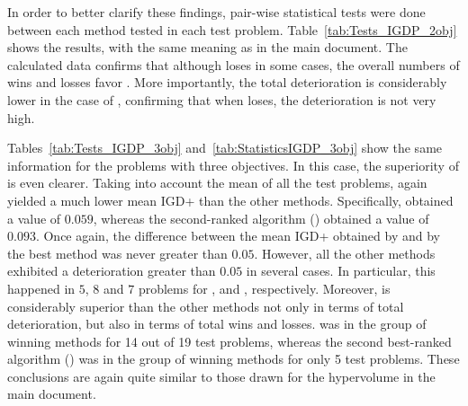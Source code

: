 In order to better clarify these findings, pair-wise statistical tests were done between each method tested in each 
test problem.
%
Table~\ref{tab:Tests_IGDP_2obj} shows the results, with the same meaning as in the main document.
%
The calculated data confirms that although \VSDMOEA{} loses in some cases, the overall numbers of wins and losses favor \VSDMOEA{}.
%
More importantly, the total deterioration is considerably lower in the case of \VSDMOEA{}, confirming that 
when \VSDMOEA{} loses, the deterioration is not very high.

Tables~\ref{tab:Tests_IGDP_3obj} and~\ref{tab:StatisticsIGDP_3obj} show the same information for the problems with three objectives.
%
In this case, the superiority of \VSDMOEA{} is even clearer.
%
Taking into account the mean of all the test problems, \VSDMOEA{} again yielded a much lower mean IGD+ than the other methods.
%
Specifically, \VSDMOEA{} obtained a value of $0.059$, whereas the second-ranked algorithm (\RMOEA{}) obtained a value of $0.093$.
%
Once again, the difference between the mean IGD+ obtained by \VSDMOEA{} and by the best method was never greater
than $0.05$.
%
However, all the other methods exhibited a deterioration greater than $0.05$ in several cases.
%
In particular, this happened in $5$, $8$ and $7$ problems for \MOEAD{}, \NSGAII{} and \RMOEA{}, respectively.
%
Moreover, \VSDMOEA{} is considerably superior than the other methods not only in terms of total deterioration, but also
in terms of total wins and losses.
%
\VSDMOEA{} was in the group of winning methods for 14 out of 19 test problems, whereas the second best-ranked algorithm (\RMOEA{})
was in the group of winning methods for only 5 test problems.
%
These conclusions are again quite similar to those drawn for the hypervolume in the main document.



